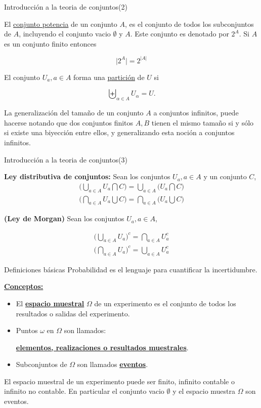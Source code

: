 \documentclass{beamer}
\begin{document}
  \begin{frame}{Introducci\'on a la teoria de conjuntos(2)}
 \small{El \underline{conjunto potencia} de un conjunto $A$, es el conjunto de todos los subconjuntos de $A$, incluyendo el conjunto vacio $\emptyset$ y $A$. Este conjunto es denotado por $2^ A$. Si $A$ es un conjunto finito entonces
 	
 	\[
 	\vert 2^A \vert = 2^{\vert A \vert}
 	\]
 	
 	El conjunto $U_a, a \in A$ forma una \underline{partici\'on} de $U$ si
 	
 	\[
 	\biguplus_{\alpha\in A} U_{\alpha} = U.
 	\]
 	
La generalizaci\'on  del tama\~no de un conjunto $A$ a conjuntos infinitos, puede hacerse notando que dos conjuntos finitos $A, B$ tienen el mismo tama\~no si y s\'olo si existe una biyecci\'on entre ellos, y generalizando esta noci\'on a conjuntos infinitos.
 	}	
\end{frame}
 

 \begin{frame}{Introducci\'on a la teoria de conjuntos(3)}
 \small{\textbf{Ley distributiva de conjuntos:}  Sean los conjuntos $U_a, a \in A$ y un conjunto $C$,
 \begin{align*}
 \Biggl( \bigcup_{a \in A} U_a  \bigcap C \Biggr) = \bigcup_{a \in A} \Biggl(U_a \bigcap C \Biggr)\\
 \Biggl( \bigcap_{a \in A} U_a  \bigcup C \Biggr) = \bigcap_{a \in A} \Biggl(U_a \bigcup C \Biggr)
 \end{align*}
 
 	
\textbf{(Ley de Morgan)} Sean los conjuntos $U_a, a \in A$,
  
\begin{align*}
\Biggl( \bigcup_{a \in A} U_a\Biggr)^c  = \bigcap_{a \in A}U_a^c \\
\Biggl( \bigcap_{a \in A} U_a\Biggr)^c  = \bigcup_{a \in A}U_a^c
 \end{align*}
  
   
}
 \end{frame}

 
  \begin{frame}{Definiciones b\'asicas }
  Probabilidad es el lenguaje para cuantificar la incertidumbre. 
  
 \textbf{\underline{Conceptos:}}
  \begin{itemize}
  	\item El \textbf{\underline{espacio muestral}} $\Omega$ de un experimento es el conjunto de todos los resultados o salidas del experimento.
  	\item  Puntos $\omega$ en $\Omega$ son llamados:
  	
  	 \textbf{\underline{elementos, realizaciones o resultados muestrales}}.
  	\item  Subconjuntos de $\Omega$ son llamados \textbf{\underline{eventos}}.
  \end{itemize}
   El espacio muestral de un experimento puede ser finito, infinito contable o infinito no contable. En particular el conjunto vacio $\emptyset$ y el espacio muestra $\Omega$ son eventos.
  \end{frame}
  
\end{document}
